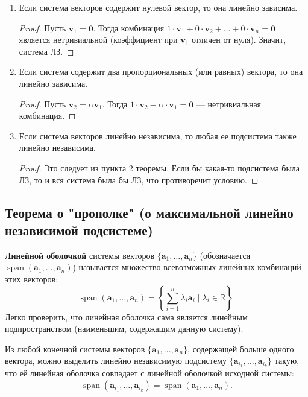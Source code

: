 \documentclass[10pt]{article}
\begin{document}
\begin{corollary}
\begin{enumerate}
    \item Если система векторов содержит нулевой вектор, то она линейно зависима.
    \begin{proof}
        Пусть \(\mathbf{v}_1 = \mathbf{0}\). Тогда комбинация \(1\cdot \mathbf{v}_1 + 0\cdot \mathbf{v}_2 + \dots + 0\cdot \mathbf{v}_n = \mathbf{0}\) является нетривиальной (коэффициент при \(\mathbf{v}_1\) отличен от нуля). Значит, система ЛЗ.
    \end{proof}

    \item Если система содержит два пропорциональных (или равных) вектора, то она линейно зависима.
    \begin{proof}
        Пусть \(\mathbf{v}_2 = \alpha \mathbf{v}_1\). Тогда \(1 \cdot \mathbf{v}_2 - \alpha \cdot \mathbf{v}_1 = \mathbf{0}\) — нетривиальная комбинация.
    \end{proof}

    \item Если система векторов линейно независима, то любая ее подсистема также линейно независима.
    \begin{proof}
        Это следует из пункта 2 теоремы. Если бы какая-то подсистема была ЛЗ, то и вся система была бы ЛЗ, что противоречит условию.
    \end{proof}
\end{enumerate}
\end{corollary}

\subsection*{Теорема о "прополке" (о максимальной линейно независимой подсистеме)}

\begin{definition}
\textbf{Линейной оболочкой} системы векторов \(\{\mathbf{a}_1, \dots, \mathbf{a}_n\}\) (обозначается \(\operatorname{span}(\mathbf{a}_1, \dots, \mathbf{a}_n)\)) называется множество всевозможных линейных комбинаций этих векторов:
\[
\operatorname{span}(\mathbf{a}_1, \dots, \mathbf{a}_n) = \left\{ \sum_{i=1}^n \lambda_i \mathbf{a}_i \;\big|\; \lambda_i \in \mathbb{R} \right\}.
\]
Легко проверить, что линейная оболочка сама является линейным подпространством (наименьшим, содержащим данную систему).
\end{definition}

\begin{theorem}
Из любой конечной системы векторов \(\{\mathbf{a}_1, \dots, \mathbf{a}_n\}\), содержащей больше одного вектора, можно выделить линейно независимую подсистему \(\{\mathbf{a}_{i_1}, \dots, \mathbf{a}_{i_k}\}\) такую, что её линейная оболочка совпадает с линейной оболочкой исходной системы:
\[
\operatorname{span}(\mathbf{a}_{i_1}, \dots, \mathbf{a}_{i_k}) = \operatorname{span}(\mathbf{a}_1, \dots, \mathbf{a}_n).
\]
\end{theorem}
\end{document}
